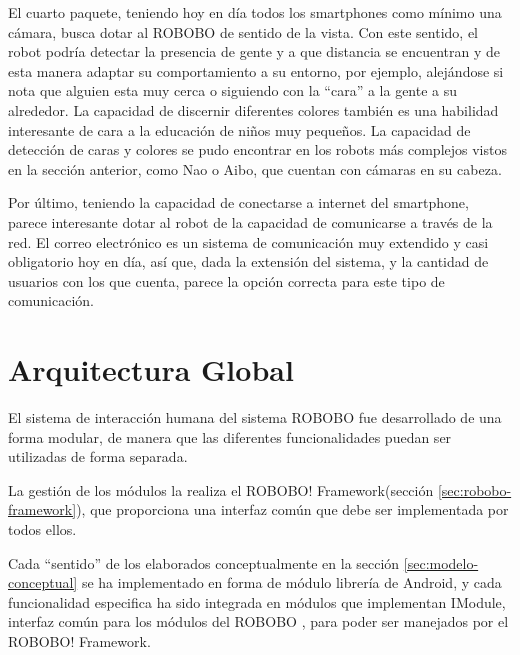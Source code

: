  El cuarto paquete, teniendo hoy en día todos los smartphones como mínimo una cámara, busca dotar al ROBOBO de sentido de la vista. Con este sentido, el robot podría detectar la presencia de gente y a que distancia se encuentran y de esta manera adaptar su comportamiento a su entorno, por ejemplo, alejándose si nota que alguien esta muy cerca o siguiendo con la \enquote{cara} a la gente a su alrededor. La capacidad de discernir diferentes colores también es una habilidad interesante de cara a la educación de niños muy pequeños. La capacidad de detección de caras y colores se pudo encontrar en los robots más complejos vistos en la sección anterior, como Nao o Aibo, que cuentan con cámaras en su cabeza.
 
 Por último, teniendo la capacidad de conectarse a internet del smartphone, parece interesante dotar al robot de la capacidad de comunicarse a través de la red. El correo electrónico es un sistema de comunicación muy extendido y casi obligatorio hoy en día, así que, dada la extensión del sistema, y la cantidad de usuarios con los que cuenta, parece la opción correcta para este tipo de comunicación.
 

\section{Arquitectura Global}
\label{sec:globalArchitecture}
El sistema de interacción humana del sistema ROBOBO fue desarrollado de una forma modular, de manera que las diferentes funcionalidades puedan ser utilizadas de forma separada.

La gestión de los módulos la realiza el ROBOBO! Framework(sección \ref{sec:robobo-framework}), que proporciona una interfaz común que debe ser implementada por todos ellos.


Cada \enquote{sentido} de los elaborados conceptualmente en la sección \ref{sec:modelo-conceptual} se ha implementado en forma de módulo librería de Android, y cada funcionalidad especifica ha sido integrada en módulos que implementan IModule, interfaz común para los módulos del ROBOBO , para poder ser manejados por el ROBOBO! Framework\cite{RoboboFramework}.

